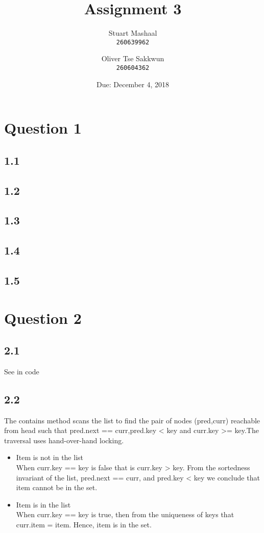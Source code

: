 \documentclass[11pt, letterpaper]{article}
\title{Assignment 3}
\author{
    Stuart Mashaal\\
    \texttt{260639962}
    \and
    Oliver Tse Sakkwun\\
    \texttt{260604362}
}
\date{Due: December 4, 2018}
\begin{document}
\begin{titlepage}
    \maketitle
    \thispagestyle{empty}
    \setcounter{page}{0}
\end{titlepage}

\section*{Question 1}
\label{sec:question_1}

\subsection*{1.1}
\label{sub:1_1}

\subsection*{1.2}
\label{sub:1_2}

\subsection*{1.3}
\label{sub:1_3}

\subsection*{1.4}
\label{sub:1_4}

\subsection*{1.5}
\label{sub:1_5}

\section*{Question 2}
\subsection*{2.1}
See in code
\subsection*{2.2}
The contains method scans the list to find the pair of nodes (pred,curr) reachable from head such that
pred.next == curr,pred.key < key and curr.key >= key.The traversal uses hand-over-hand locking.
\begin{itemize}
\item Item is not in the list \\
When curr.key == key is false that is curr.key > key. From the sortedness
invariant of the list, pred.next == curr, and pred.key < key we conclude that item cannot be in the
set.

 \item Item is in the list \\
When curr.key == key is true, then from the uniqueness of keys that curr.item = item. Hence, item is in the set.
\end{itemize}
\end{document}
